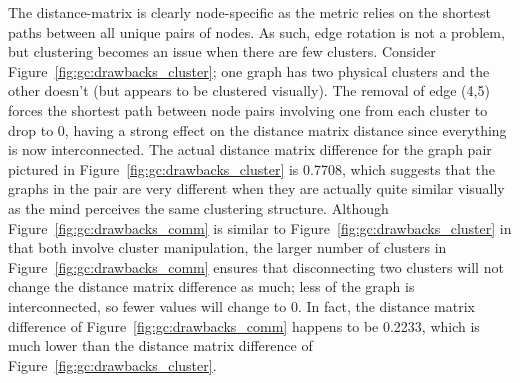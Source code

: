 The distance-matrix is clearly node-specific as the metric relies on the 
shortest paths between all unique pairs of nodes. As such, edge rotation is not 
a problem, but clustering becomes an issue when there are few clusters. 
Consider Figure~\ref{fig:gc:drawbacks_cluster}; one graph has two physical 
clusters and the other doesn't (but appears to be clustered visually). 
The removal of edge (4,5) forces the shortest path between node pairs involving 
one from each cluster to drop to 0, having a strong effect on the distance 
matrix distance since everything is now interconnected. 
The actual distance matrix difference for the graph pair pictured in 
Figure~\ref{fig:gc:drawbacks_cluster} is 0.7708, which suggests that the graphs 
in the pair are very different when they are actually quite similar visually as 
the mind perceives the same clustering structure. 
Although Figure~\ref{fig:gc:drawbacks_comm} is similar to 
Figure~\ref{fig:gc:drawbacks_cluster} in that both involve cluster 
manipulation, the larger number of clusters in 
Figure~\ref{fig:gc:drawbacks_comm} ensures that disconnecting two clusters will 
not change the distance matrix difference as much; less of the graph is 
interconnected, so fewer values will change to 0. In fact, the distance matrix 
difference of Figure~\ref{fig:gc:drawbacks_comm} happens to be 0.2233, which is 
much lower than the distance matrix difference of 
Figure~\ref{fig:gc:drawbacks_cluster}. 









